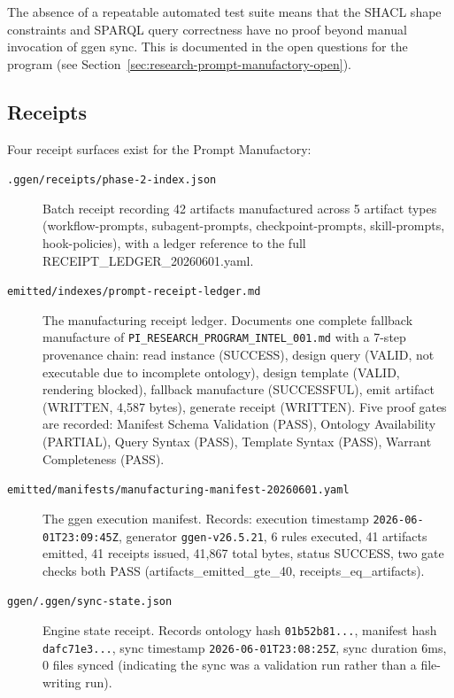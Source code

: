 The absence of a repeatable automated test suite means that the SHACL shape constraints
and SPARQL query correctness have no proof beyond manual invocation of ggen sync. This
is documented in the open questions for the program (see Section~\ref{sec:research-prompt-manufactory-open}).

\subsection{Receipts}
\label{sec:research-prompt-manufactory-evidence-receipts}

Four receipt surfaces exist for the Prompt Manufactory:

\begin{description}
  \item[\texttt{.ggen/receipts/phase-2-index.json}] Batch receipt recording 42 artifacts
    manufactured across 5 artifact types (workflow-prompts, subagent-prompts,
    checkpoint-prompts, skill-prompts, hook-policies), with a ledger reference to the
    full RECEIPT\_LEDGER\_20260601.yaml.

  \item[\texttt{emitted/indexes/prompt-receipt-ledger.md}] The manufacturing receipt
    ledger. Documents one complete fallback manufacture of
    \texttt{PI\_RESEARCH\_PROGRAM\_INTEL\_001.md} with a 7-step provenance chain: read
    instance (SUCCESS), design query (VALID, not executable due to incomplete ontology),
    design template (VALID, rendering blocked), fallback manufacture (SUCCESSFUL),
    emit artifact (WRITTEN, 4,587 bytes), generate receipt (WRITTEN). Five proof gates
    are recorded: Manifest Schema Validation (PASS), Ontology Availability (PARTIAL),
    Query Syntax (PASS), Template Syntax (PASS), Warrant Completeness (PASS).

  \item[\texttt{emitted/manifests/manufacturing-manifest-20260601.yaml}] The ggen
    execution manifest. Records: execution timestamp
    \texttt{2026-06-01T23:09:45Z}, generator \texttt{ggen-v26.5.21}, 6 rules executed,
    41 artifacts emitted, 41 receipts issued, 41,867 total bytes, status SUCCESS, two
    gate checks both PASS (artifacts\_emitted\_gte\_40, receipts\_eq\_artifacts).

  \item[\texttt{ggen/.ggen/sync-state.json}] Engine state receipt. Records ontology hash
    \texttt{01b52b81...}, manifest hash \texttt{dafc71e3...}, sync timestamp
    \texttt{2026-06-01T23:08:25Z}, sync duration 6ms, 0 files synced (indicating the
    sync was a validation run rather than a file-writing run).
\end{description}

